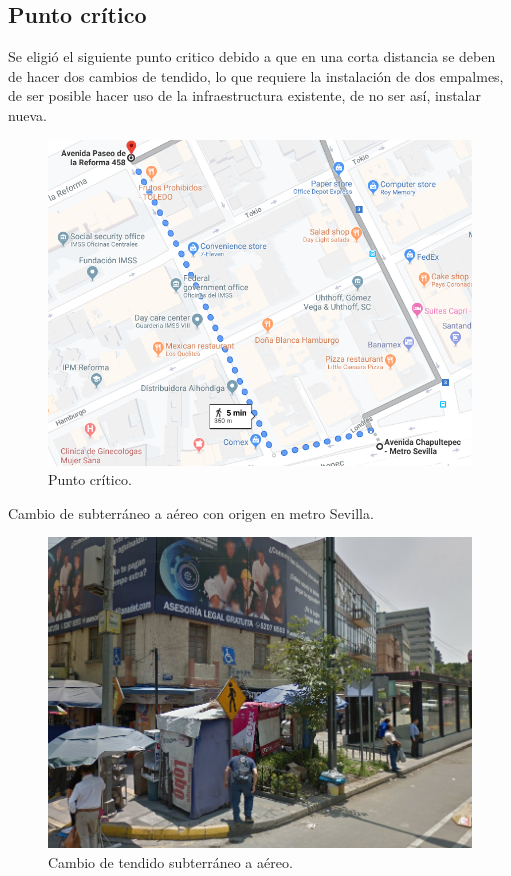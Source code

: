 \documentclass[12pt,letterpaper]{article}
\begin{document}
\subsection{Punto crítico}
Se eligió el siguiente punto critico debido a que en una corta distancia se deben de hacer 
dos cambios de tendido, lo que requiere la instalación de dos empalmes, de ser posible hacer 
uso de la infraestructura existente, de no ser así, instalar nueva.
\begin{figure}[ht]
    \centering
    \includegraphics[scale=.8]{imagenes/puntocritico.png}
    \caption{Punto crítico.}
\end{figure}

\newpage
Cambio de subterráneo a aéreo con origen en metro Sevilla.
\begin{figure}[ht]
    \centering
    \includegraphics[scale=.7]{imagenes/pc2.png}
    \caption{Cambio de tendido subterráneo a aéreo.}
\end{figure}
\end{document}
